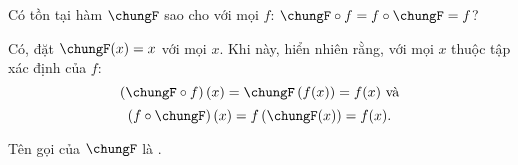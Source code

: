 \exercise Có tồn tại hàm $\chungF$ sao cho với mọi $f$: $\chungF \circ f = f \circ \chungF = f$?

\solution

Có, đặt $\chungF(x) = x$ với mọi $x$. Khi này, hiển nhiên rằng, với mọi $x$ thuộc tập xác định của $f$:
$$\left(\chungF \circ f\right)(x) = \chungF\left(f(x)\right) = f(x)~\text{và}$$
$$\left(f \circ \chungF\right)(x) = f\left(\chungF(x)\right) = f(x).$$

Tên gọi của $\chungF$ là .